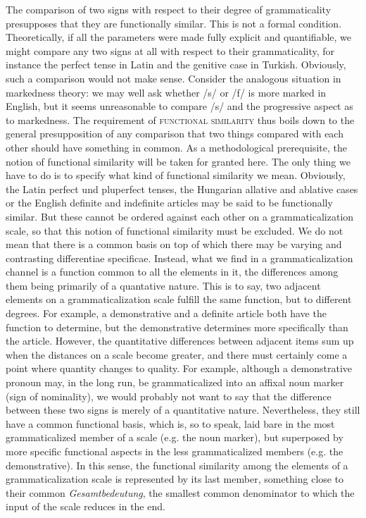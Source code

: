 \label{page135}The comparison of two signs with respect to their degree of grammaticality presupposes that they are functionally similar. This is not a formal condition. Theoretically, if all the parameters were made fully explicit and quantifiable, we might compare any two signs at all with respect to their grammaticality, for instance the perfect tense in Latin and the genitive case in Turkish. Obviously, such a comparison would not make sense. Consider the analogous situation in markedness theory: we may well ask whether /s/ or /f/ is more marked in English, but it seems unreasonable to compare /s/ and the progressive aspect as to markedness. The requirement of \textsc{functional similarity} thus boils down to the general presupposition of any comparison that two things compared with each other should have something in common. As a methodological prerequisite, the notion of functional similarity will be taken for granted here. The only thing we have to do is to specify what kind of functional similarity we mean. Obviously, the Latin perfect und pluperfect tenses, the Hungarian allative and ablative cases or the English definite and indefinite articles may be said to be functionally similar. But these cannot be ordered against each other on a grammaticalization scale, so that this notion of functional similarity must be excluded. We do not mean that there is a common basis on top of which there may be varying and contrasting differentiae specificae. Instead, what we find in a grammaticalization channel is a function common to all the elements in it, the differences among them being primarily of a quantative nature. This is to say, two adjacent elements on a grammaticalization scale fulfill the same function, but to different degrees. For example, a demonstrative and a definite article both have the function to determine, but the demonstrative determines more specifically than the article. However, the quantitative differences between adjacent items sum up when the distances on a scale become greater, and there must certainly come a point where quantity changes to quality. For example, although a demonstrative pronoun may, in the long run, be grammaticalized into an affixal noun marker (sign of nominality), we would probably not want to say that the difference between these two signs is merely of a quantitative nature. Nevertheless, they still have a common functional basis, which is, so to speak, laid bare in the most grammaticalized member of a scale (e.g. the noun marker), but superposed by more specific functional aspects in the less grammaticalized members (e.g. the demonstrative). In this sense, the functional similarity among the elements of a grammaticalization scale is represented by its last member, something close to their common \textit{Gesamtbedeutung}, the smallest common denominator to which the input of the scale reduces in the end.\label{page135b}

